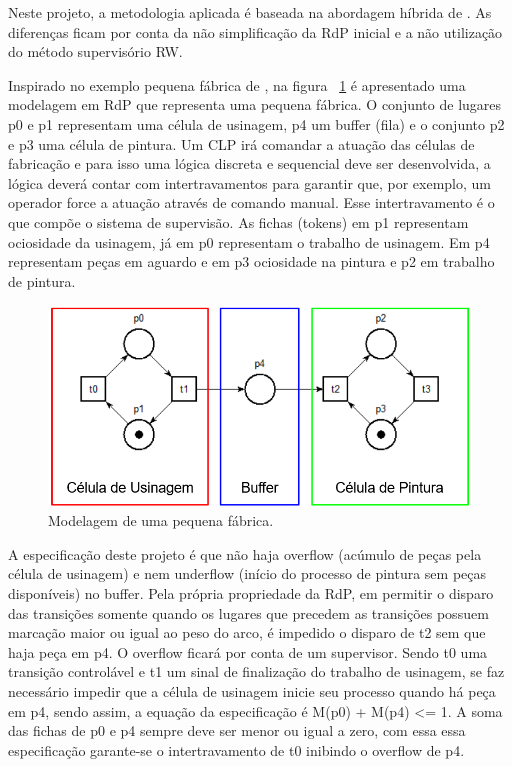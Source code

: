 Neste projeto, a metodologia aplicada \'e baseada na abordagem h\'ibrida de \cite{UzamWonham2005}. As diferen\c{c}as ficam por conta da n\~ao simplifica\c{c}\~ao da RdP inicial e a n\~ao utiliza\c{c}\~ao do m\'etodo supervis\'orio RW.

Inspirado no exemplo pequena f\'abrica de \cite{apostilacury}, na figura ~\ref{fig:pqnafab} \'e apresentado uma modelagem em RdP que representa uma pequena f\'abrica. O conjunto de lugares p0 e p1 representam uma c\'elula de usinagem, p4 um buffer (fila) e o conjunto p2 e p3 uma c\'elula de pintura. Um CLP ir\'a comandar a atua\c{c}\~ao das c\'elulas de fabrica\c{c}\~ao e para isso uma l\'ogica discreta e sequencial deve ser desenvolvida, a l\'ogica dever\'a contar com intertravamentos para garantir que, por exemplo, um operador force a atua\c{c}\~ao atrav\'es de comando manual. Esse intertravamento \'e o que comp\~oe o sistema de supervis\~ao.
As fichas (tokens) em p1 representam ociosidade da usinagem, j\'a em p0 representam o trabalho de usinagem. Em p4 representam pe\c{c}as em aguardo e em p3 ociosidade na pintura e p2 em trabalho de pintura.\

\begin{figure}[!htb]
	\caption[Modelagem de uma pequena f\'abrica.]{Modelagem de uma pequena f\'abrica.}
	\label{fig:pqnafab}
	\includegraphics[width=16cm]{./figuras/PQNAFAB.png}\centering
\end{figure}

A especifica\c{c}\~ao deste projeto \'e que n\~ao haja overflow (ac\'umulo de pe\c{c}as pela c\'elula de usinagem) e nem underflow (in\'icio do processo de pintura sem pe\c{c}as dispon\'iveis) no buffer. Pela pr\'opria propriedade da RdP, em permitir o disparo das transi\c{c}\~oes somente quando os lugares que precedem as transi\c{c}\~oes possuem marca\c{c}\~ao maior ou igual ao peso do arco, \'e impedido o disparo de t2 sem que haja pe\c{c}a em p4. O overflow ficar\'a por conta de um supervisor. Sendo t0 uma transi\c{c}\~ao control\'avel e t1 um sinal de finaliza\c{c}\~ao do trabalho de usinagem, se faz necess\'ario impedir que a c\'elula de usinagem inicie seu processo quando h\'a pe\c{c}a em p4, sendo assim, a equa\c{c}\~ao da especifica\c{c}\~ao \'e M(p0) + M(p4) <= 1. A soma das fichas de p0 e p4 sempre deve ser menor ou igual a zero, com essa essa especifica\c{c}\~ao garante-se o intertravamento de t0 inibindo o overflow de p4.

